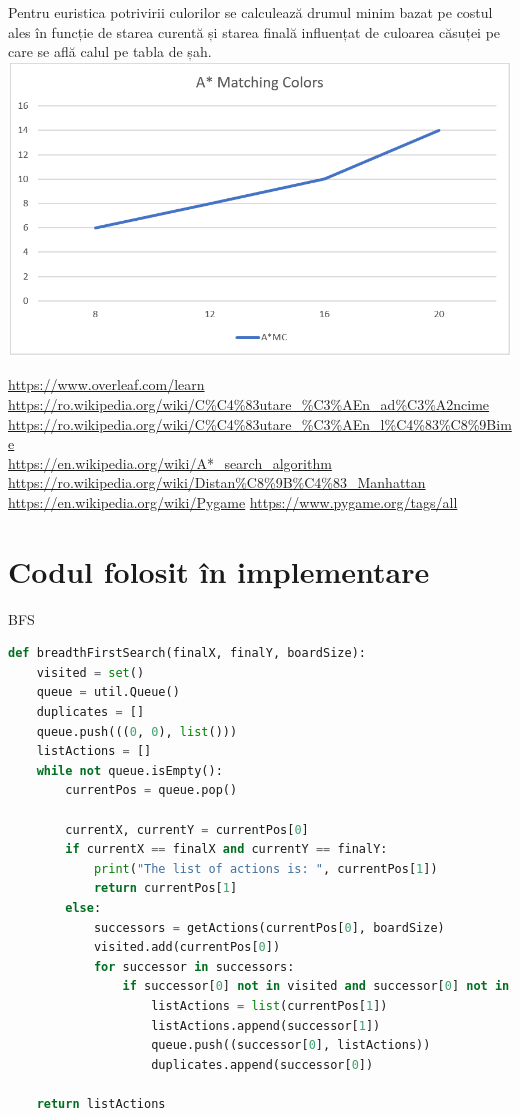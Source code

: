 \documentclass[a4paper,12pt]{report}
\begin{document}
 Pentru euristica potrivirii culorilor se calculează drumul minim bazat pe costul ales în funcție de starea curentă și starea finală influențat de culoarea căsuței pe care se află calul pe tabla de șah.\\
 \includegraphics{fig/ASSMC.PNG}

  
\url{https://www.overleaf.com/learn} \\
\url{https://ro.wikipedia.org/wiki/C%C4%83utare_%C3%AEn_ad%C3%A2ncime} \\
\url{https://ro.wikipedia.org/wiki/C%C4%83utare_%C3%AEn_l%C4%83%C8%9Bime} \\
\url{https://en.wikipedia.org/wiki/A*_search_algorithm}
\url{https://ro.wikipedia.org/wiki/Distan%C8%9B%C4%83_Manhattan}
\url{https://en.wikipedia.org/wiki/Pygame}
\url{https://www.pygame.org/tags/all}
\appendix

\chapter{Codul folosit în implementare}
 BFS\\
\begin{lstlisting}[language=Python]
def breadthFirstSearch(finalX, finalY, boardSize):
    visited = set()
    queue = util.Queue()
    duplicates = []
    queue.push(((0, 0), list()))
    listActions = []
    while not queue.isEmpty():
        currentPos = queue.pop()

        currentX, currentY = currentPos[0]
        if currentX == finalX and currentY == finalY:
            print("The list of actions is: ", currentPos[1])
            return currentPos[1]
        else:
            successors = getActions(currentPos[0], boardSize)
            visited.add(currentPos[0])
            for successor in successors:
                if successor[0] not in visited and successor[0] not in duplicates:
                    listActions = list(currentPos[1])
                    listActions.append(successor[1])
                    queue.push((successor[0], listActions))
                    duplicates.append(successor[0])

    return listActions 

\end{lstlisting} 
\end{document}

